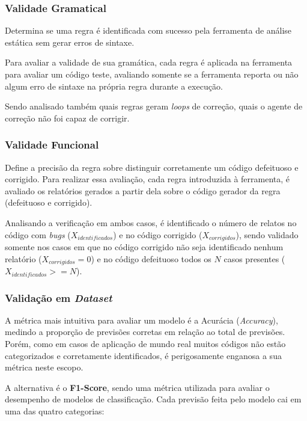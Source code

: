 \documentclass[
    12pt,                %
    openright,           %
    oneside,             %
    a4paper,             %
    english,             %
    brazil               %
]{abntex2}
\begin{document}
\subsubsection{Validade Gramatical}
\label{sec:validadegramatica}
\par
Determina se uma regra é identificada com sucesso pela ferramenta de análise estática sem gerar erros de sintaxe.
\par
Para avaliar a validade de sua gramática, cada regra é aplicada na ferramenta para avaliar um código teste, avaliando somente se a ferramenta reporta ou não algum erro de sintaxe na própria regra durante a execução. 
\par
Sendo analisado também quais regras geram \textit{loops} de correção, quais o agente de correção não foi capaz de corrigir.

\subsubsection{Validade Funcional}
\label{sec:validadefuncional}
\par
Define a precisão da regra sobre distinguir corretamente um código defeituoso e corrigido.
Para realizar essa avaliação, cada regra introduzida à ferramenta, é avaliado os relatórios gerados a partir dela sobre o código gerador da regra (defeituoso e corrigido).
\par
Analisando a verificação em ambos casos, é identificado o número de relatos no código com \textit{bugs} ($X_{identificados}$) e no código corrigido ($X_{corrigidos}$), sendo validado somente nos casos em que no código corrigido não seja identificado nenhum relatório ($X_{corrigidos} = 0$) e no código defeituoso todos os $N$ casos presentes ($X_{identificados} >= N$).

\subsubsection{Validação em \textit{Dataset}}
\label{sec:validadedataset}
\par
A métrica mais intuitiva para avaliar um modelo é a Acurácia (\textit{Accuracy}), medindo a proporção de previsões corretas em relação ao total de previsões.
Porém, como em casos de aplicação de mundo real muitos códigos não estão categorizados e corretamente identificados, é perigosamente enganosa a sua métrica neste escopo.
\par
A alternativa é o \textbf{F1-Score}, sendo uma métrica utilizada para avaliar o desempenho de modelos de classificação.
Cada previsão feita pelo modelo cai em uma das quatro categorias:
\end{document}
